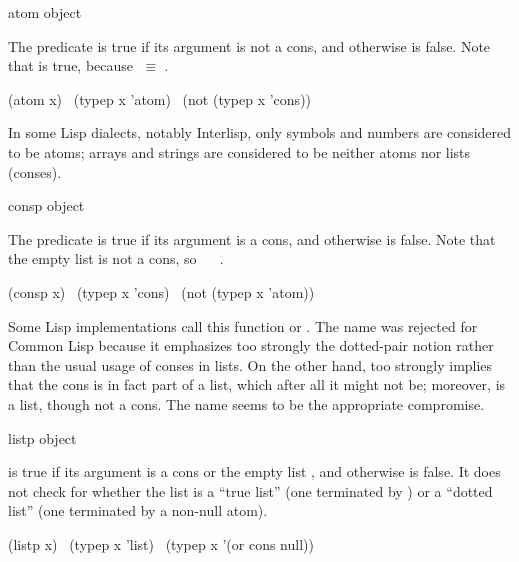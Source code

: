 \begin{defun}[Function]
atom object

The predicate  is true if its argument is not a cons,
and otherwise is false.
Note that  is true, because {\emptylist}$\;\equiv\;${\nil}.
\begin{lisp}
(atom x) \EQ\ (typep x 'atom) \EQ\ (not (typep x 'cons))
\end{lisp}

\beforenoterule
\begin{incompatibility}
In some Lisp dialects, notably Interlisp,
only symbols and numbers are considered to be atoms; arrays
and strings are considered to be neither atoms nor lists (conses).
\end{incompatibility}
\afternoterule
\end{defun}

\begin{defun}[Function]
consp object

The predicate  is true if its argument is a cons,
and otherwise is false.
Note that the empty list is not a cons, so
 \EQ\  \EV\ {\nil}.
\begin{lisp}
(consp x) \EQ\ (typep x 'cons) \EQ\ (not (typep x 'atom))
\end{lisp}

\beforenoterule
\begin{incompatibility}
Some Lisp implementations call this function
 or .  The name  was rejected for Common Lisp
because it emphasizes too strongly the dotted-pair notion rather than the
usual usage of conses in lists.  On the other hand,  too strongly
implies that the cons is in fact part of a list, which after all it might
not be; moreover, {\emptylist} is a list, though not a cons.
The name  seems to be the appropriate compromise.
\end{incompatibility}
\afternoterule
\end{defun}

\begin{defun}[Function]
listp object

 is true if its argument is a cons or the empty list {\emptylist},
and otherwise is false.  It does not check for whether the list
is a ``true list'' (one terminated by {\nil}) or a ``dotted list''
(one terminated by a non-null atom).
\begin{lisp}
(listp x) \EQ\ (typep x 'list) \EQ\ (typep x '(or cons null))
\end{lisp}
\end{defun}


